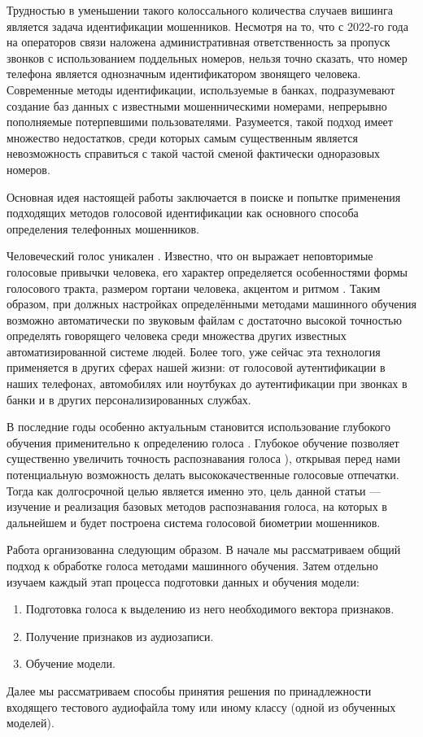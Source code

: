 \documentclass[12pt]{gost-7-32}
\begin{document}
Трудностью в уменьшении такого колоссального \cite{korea_vishing} количества случаев вишинга является задача идентификации мошенников.
Несмотря на то, что с 2022-го года на операторов связи наложена административная ответственность за пропуск звонков с использованием поддельных номеров, нельзя точно сказать, что номер телефона является однозначным идентификатором звонящего человека.
Современные методы идентификации, используемые в банках, подразумевают создание баз данных с известными мошенническими номерами, непрерывно пополняемые потерпевшими пользователями.
Разумеется, такой подход имеет множество недостатков, среди которых самым существенным является невозможность справиться с такой частой сменой фактически одноразовых номеров.

Основная идея настоящей работы заключается в поиске и попытке применения подходящих методов голосовой идентификации как основного способа определения телефонных мошенников.

Человеческий голос уникален \cite{bai2021, irum_overview}.
Известно, что он выражает неповторимые голосовые привычки человека, его характер определяется особенностями формы голосового тракта, размером гортани человека, акцентом и ритмом \cite{kin2010}.
Таким образом, при должных настройках определёнными методами машинного обучения возможно автоматически по звуковым файлам с достаточно высокой точностью \cite{bai2021, irum_overview, lstm} определять говорящего человека среди множества других известных автоматизированной системе людей.
Более того, уже сейчас эта технология применяется в других сферах нашей жизни: от голосовой аутентификации в наших телефонах, автомобилях или ноутбуках до аутентификации при звонках в банки и в других персонализированных службах.

В последние годы особенно актуальным становится использование глубокого обучения применительно к определению голоса \cite{bai2021, irum_overview}.
Глубокое обучение позволяет существенно увеличить точность распознавания голоса \cite{deep2018, eshan_deep, deep_text_dep}), открывая перед нами потенциальную возможность делать высококачественные голосовые отпечатки.
Тогда как долгосрочной целью является именно это, цель данной статьи --- изучение и реализация базовых методов распознавания голоса, на которых в дальнейшем и будет построена система голосовой биометрии мошенников.

Работа организованна следующим образом.
В начале мы рассматриваем общий подход к обработке голоса методами машинного обучения.
Затем отдельно изучаем каждый этап процесса подготовки данных и обучения модели:
\begin{enumerate}
\setlength{\itemsep}{1pt}
\setlength{\parskip}{0pt}
\setlength{\parsep}{0pt}

    \item Подготовка голоса к выделению из него необходимого вектора признаков.
    \item Получение признаков из аудиозаписи.
    \item Обучение модели.
\end{enumerate}
Далее мы рассматриваем способы принятия решения по принадлежности входящего тестового аудиофайла тому или иному классу (одной из обученных моделей).
\end{document}
